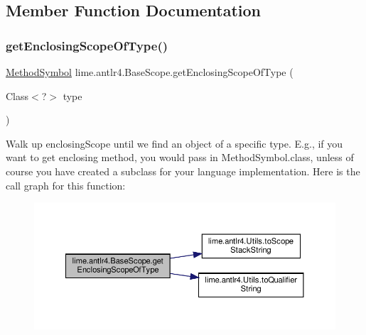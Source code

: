 \subsection{Member Function Documentation}
\mbox{\label{classlime_1_1antlr4_1_1BaseScope_a3ec1571964f0556d2137fcaeacfe6ef2}} 
\subsubsection{\texorpdfstring{get\+Enclosing\+Scope\+Of\+Type()}{getEnclosingScopeOfType()}}
{\footnotesize\ttfamily \hyperlink{classlime_1_1antlr4_1_1MethodSymbol}{Method\+Symbol} lime.\+antlr4.\+Base\+Scope.\+get\+Enclosing\+Scope\+Of\+Type (\begin{DoxyParamCaption}\item[{Class$<$?$>$}]{type }\end{DoxyParamCaption})}

Walk up enclosing\+Scope until we find an object of a specific type. E.\+g., if you want to get enclosing method, you would pass in Method\+Symbol.\+class, unless of course you have created a subclass for your language implementation. Here is the call graph for this function\+:
\nopagebreak
\begin{figure}[H]
\begin{center}
\leavevmode
\includegraphics[width=350pt]{classlime_1_1antlr4_1_1BaseScope_a3ec1571964f0556d2137fcaeacfe6ef2_cgraph}
\end{center}
\end{figure}
\mbox{\label{classlime_1_1antlr4_1_1BaseScope_affbef0d910750e3da48f581d10f68b68}} 
